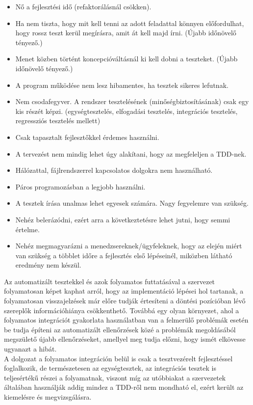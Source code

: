 \begin{itemize}
\item Nő a fejlesztési idő (refaktorálásnál csökken).
\item Ha nem tiszta, hogy mit kell tenni az adott feladattal könnyen előfordulhat, hogy rossz teszt kerül megírásra, amit át kell majd írni. (Újabb időnövelő tényező.)
\item Menet közben történt koncepcióváltásnál ki kell dobni a teszteket. (Újabb időnövelő tényező.)
\item A program működése nem lesz hibamentes, ha tesztek sikeres lefutnak.
\item Nem csodafegyver. A rendszer tesztelésének (minőségbiztosításának) csak egy kis részét képzi. (egységtesztelés, elfogadási tesztelés, integrációs tesztelés, regressziós tesztelés mellett)
\item Csak tapasztalt fejlesztőkkel érdemes használni.
\item A tervezést nem mindig lehet úgy alakítani, hogy az megfeleljen a TDD-nek.
\item Hálózattal, fájlrendszerrel kapcsolatos dolgokra nem használható.
\item Páros programozásban a legjobb használni.
\item A tesztek írása unalmas lehet egyesek számára. Nagy fegyelemre van szükség.
\item Nehéz belerázódni, ezért arra a következtetésre lehet jutni, hogy semmi értelme.
\item Nehéz megmagyarázni a menedzsereknek/ügyfeleknek, hogy az elején miért van szükség a többlet időre a fejlesztés első lépéseinél, miközben látható eredmény nem készül.
\end{itemize}

Az automatizált tesztekkel és azok folyamatos futtatásával a szervezet folyamatosan képet kaphat arról, hogy az implementáció lépései hol tartanak, a folyamatosan visszajelzések már előre tudják értesíteni a döntési pozícióban lévő szereplők információhiánya csökkenthető. Továbbá egy olyan környezet, ahol a folyamatos integrációt gyakorlata használatban van a felmerülő problémák esetén be tudja építeni az automatizált ellenőrzések közé a problémák megoldásából megszülető újabb ellenőrzéseket, amellyel meg tudja előzni, hogy ismét elkövesse ugyanazt a hibát.
\\
A dolgozat a folyamatos integráción belül is csak a tesztvezérelt fejlesztéssel foglalkozik, de természetesen az egységtesztek, az integrációs tesztek is teljesértékű részei a folyamatnak, viszont míg az utóbbiakat a szervezetek általában használják addig mindez a TDD-ről nem mondható el, ezért került az kiemelésre és megvizsgálásra.